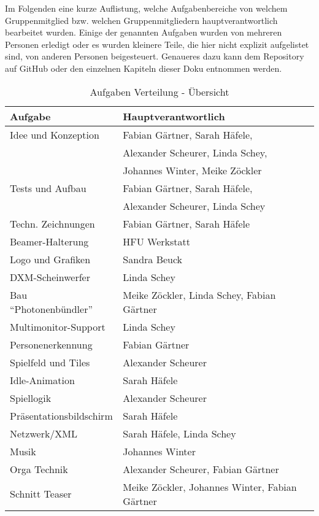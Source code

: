 
Im Folgenden eine kurze Auflistung, welche Aufgabenbereiche von welchem Gruppenmitglied bzw. welchen Gruppenmitgliedern hauptverantwortlich bearbeitet wurden. Einige der genannten Aufgaben wurden von mehreren Personen erledigt oder es wurden kleinere Teile, die hier nicht explizit aufgelistet sind, von anderen Personen beigesteuert. Genaueres dazu kann dem Repository auf GitHub oder den einzelnen Kapiteln dieser Doku entnommen werden.

\begin{center}
\begin{table}[hc]
\begin{tabular}[hc]{l|l}
\textbf{Aufgabe} & \textbf{Hauptverantwortlich}\\
\hline
Idee und Konzeption& Fabian Gärtner, Sarah Häfele,\\
&Alexander Scheurer, Linda Schey,\\
&Johannes Winter, Meike Zöckler\\\hline
Tests und Aufbau& Fabian Gärtner, Sarah Häfele,\\
&Alexander Scheurer, Linda Schey\\\hline
Techn. Zeichnungen& Fabian Gärtner, Sarah Häfele\\\hline
Beamer-Halterung& HFU Werkstatt\\\hline
Logo und Grafiken& Sandra Beuck\\\hline
DXM-Scheinwerfer&Linda Schey\\\hline
Bau \enquote{Photonenbündler}&Meike Zöckler, Linda Schey, Fabian Gärtner\\\hline
Multimonitor-Support& Linda Schey\\\hline
Personenerkennung& Fabian Gärtner\\\hline
Spielfeld und Tiles& Alexander Scheurer\\\hline
Idle-Animation& Sarah Häfele\\\hline
Spiellogik& Alexander Scheurer\\\hline
Präsentationsbildschirm& Sarah Häfele\\\hline
Netzwerk/XML& Sarah Häfele, Linda Schey\\\hline
Musik& Johannes Winter\\\hline
Orga Technik& Alexander Scheurer, Fabian Gärtner\\\hline
Schnitt Teaser& Meike Zöckler, Johannes Winter, Fabian Gärtner\\
\hline
\end{tabular}
\caption{Aufgaben Verteilung - Übersicht}
\end{table}
\end{center}